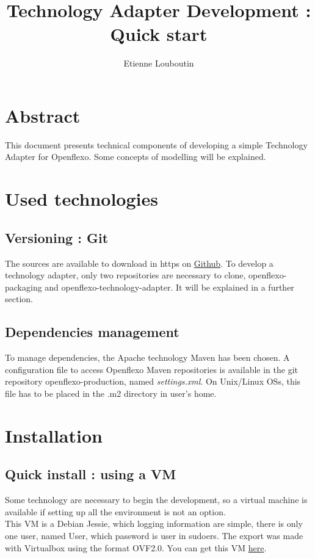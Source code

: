 \documentclass[9pt,a4paper]{article}
\author{Etienne Louboutin}
\title{Technology Adapter Development : Quick start}
\begin{document}
\maketitle

\tableofcontents

\section{Abstract}

This document presents technical components of developing a simple Technology Adapter for Openflexo. Some concepts of modelling  will be explained.


\section{Used technologies}
	\subsection{Versioning : Git}
		The sources are available to download in https on \href{https://github.com/orgs/openflexo-team/dashboard}{Github}. To develop a technology adapter, only two repositories are necessary to clone, openflexo-packaging and openflexo-technology-adapter. It will be explained in a further section.
		
	\subsection{Dependencies management}
		To manage dependencies, the Apache technology Maven has been chosen. A configuration file to access Openflexo Maven repositories is available in the git repository openflexo-production, named \textit{settings.xml}. On Unix/Linux OSs, this file has to be placed in the .m2 directory in user's home.
		
\section{Installation}
	\subsection{Quick install : using a VM}
	Some technology are necessary to begin the development, so a virtual machine is available if setting up all the environment is not an option.\\
This VM is a Debian Jessie, which logging information are simple, there is only one user, named User, which password is user in sudoers. The export was made with Virtualbox using the format OVF2.0. You can get this VM \href{https://downloads.openflexo.org/vms/}{here}.
	
\end{document}
